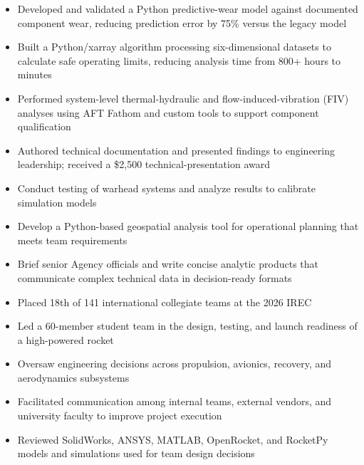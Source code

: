 \documentclass[10pt,letterpaper]{article}
\begin{document}
\resumeHeader
{}


\begin{itemize}
  \item Developed and validated a Python predictive-wear model against documented component wear, reducing prediction error by 75\% versus the legacy model
  \item Built a Python/xarray algorithm processing six-dimensional datasets to calculate safe operating limits, reducing analysis time from 800+ hours to minutes
  \item Performed system-level thermal-hydraulic and flow-induced-vibration (FIV) analyses using AFT Fathom and custom tools to support component qualification
  \item Authored technical documentation and presented findings to engineering leadership; received a \$2,500 technical-presentation award
\end{itemize}

\vspace{2pt}
\begin{itemize}
  \item Conduct testing of warhead systems and analyze results to calibrate simulation models
  \item Develop a Python-based geospatial analysis tool for operational planning that meets team requirements
  \item Brief senior Agency officials and write concise analytic products that communicate complex technical data in decision-ready formats
\end{itemize}

\vspace{2pt}
\earlierRoles
\begin{itemize}
  \item Placed 18th of 141 international collegiate teams at the 2026 IREC
  \item Led a 60-member student team in the design, testing, and launch readiness of a high-powered rocket
  \item Oversaw engineering decisions across propulsion, avionics, recovery, and aerodynamics subsystems
  \item Facilitated communication among internal teams, external vendors, and university faculty to improve project execution
  \item Reviewed SolidWorks, ANSYS, MATLAB, OpenRocket, and RocketPy models and simulations used for team design decisions
\end{itemize}
\end{document}
